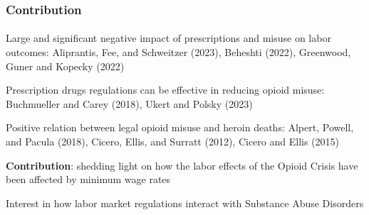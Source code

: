\begin{frame}

    \frametitle{Contribution} %
    \framesubtitle{}  %
    \rmfamily %

    \begin{wideitemize}
        \item Large and significant negative impact of prescriptions and misuse on labor outcomes: {\footnotesize \textcolor{fgre}{Aliprantis, Fee, and Schweitzer (2023), Beheshti (2022), Greenwood, Guner and Kopecky (2022)}} %
        \item Prescription drugs regulations can be effective in reducing opioid misuse: {\footnotesize  \textcolor{fgre}{Buchmueller and Carey (2018), Ukert and Polsky (2023)}}
        \item Positive relation between legal opioid misuse and heroin deaths: {\footnotesize \textcolor{fgre}{Alpert, Powell, and Pacula (2018), Cicero, Ellis, and Surratt (2012), Cicero and Ellis (2015)} }
    \end{wideitemize}

    \vspace{9pt}
    \textbf{Contribution}: shedding light on how the labor effects of the \textcolor{fblu}{Opioid Crisis} have been affected by \textcolor{fblu}{minimum wage rates}
    \vspace{9pt}
    
    \begin{wideitemize}
        \item Interest in how \textcolor{fblu}{labor market regulations} interact with \textcolor{fblu}{Substance Abuse Disorders}
    \end{wideitemize}
    
\end{frame}

